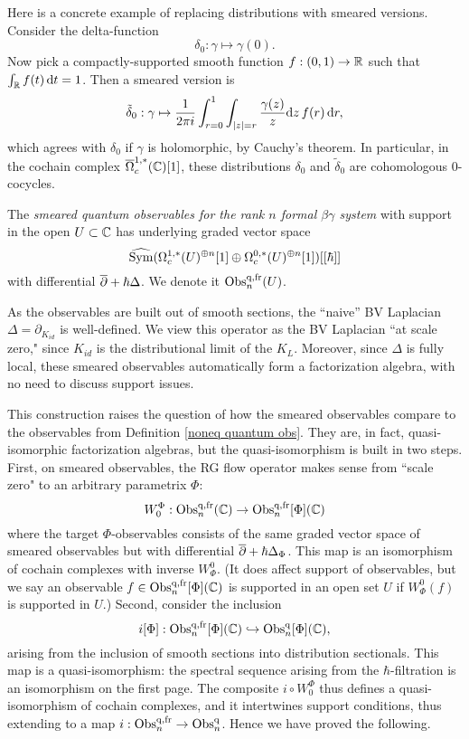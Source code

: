 Here is a concrete example of replacing distributions with smeared versions.
Consider the delta-function 
\[
\delta_0: \gamma \mapsto \gamma(0).
\]
Now pick a compactly-supported smooth function $f: (0,1) \to \mathbb R$ such that $\int_\mathbb R f(t) \, {\rm d} t = 1$.
Then a smeared version is
\[
\tilde{\delta}_0: \gamma \mapsto \frac{1}{2\pi i}\int_{r = 0}^1 \int_{|z|=r} \frac{\gamma(z)}{z} {\rm d} z\, f(r) \,{\rm d} r,
\]
which agrees with $\delta_0$ if $\gamma$ is holomorphic, by Cauchy's theorem.
In particular, in the cochain complex $\overline{\Omega}^{1,*}_c(\mathbb C)[1]$, 
these distributions $\delta_0$ and $\tilde{\delta}_0$ are cohomologous $0$-cocycles.

\def\fr{{\rm fr}}

\begin{dfn}
The \emph{smeared quantum observables for the rank $n$ formal $\beta\gamma$ system} 
with support in the open $U \subset \mathbb C$ has underlying graded vector space
\[
\widehat{{\rm Sym}}({\Omega}^{1,*}_c(U)^{\oplus n}[1] \oplus {\Omega}^{0,*}_c(U)^{\oplus n}[1])[[\hbar]]
\]
with differential $\overline{\partial} + \hbar \Delta$. 
We denote it $\Obs^{\q,\fr}_n(U)$.
\end{dfn}

As the observables are built out of smooth sections, the ``naive'' BV Laplacian $\Delta = \partial_{K_{id}}$ is well-defined.
We view this operator as the BV Laplacian ``at scale zero," since $K_{id}$ is the distributional limit of the $K_L$.
Moreover, since $\Delta$ is fully local, these smeared observables automatically form a factorization algebra,
with no need to discuss support issues.

This construction raises the question of how the smeared observables compare to the observables from Definition \ref{noneq quantum obs}.
They are, in fact, quasi-isomorphic factorization algebras, but the quasi-isomorphism is built in two steps.
First, on smeared observables, the RG flow operator makes sense from ``scale zero" to an arbitrary parametrix $\Phi$:
\[
W_0^\Phi: \Obs^{\q,\fr}_n(\CC) \to \Obs^{\q,\fr}_n[\Phi](\CC)
\]
where the target $\Phi$-observables consists of the same graded vector space of smeared observables 
but with differential $\overline{\partial} +\hbar \Delta_\Phi$.
This map is an isomorphism of cochain complexes with inverse $W_\Phi^0$.
(It does affect support of observables, but we say an observable $f \in \Obs^{\q,\fr}_n[\Phi](\CC)$ is supported in an open set $U$
if $W_\Phi^0(f)$ is supported in $U$.)
Second, consider the inclusion
\[
i[\Phi]: \Obs^{\q,\fr}_n[\Phi](\CC) \hookrightarrow \Obs^{\q}_n[\Phi](\CC),
\]
arising from the inclusion of smooth sections into distribution sectionals. 
This map is a quasi-isomorphism: the spectral sequence arising from the $\hbar$-filtration is an isomorphism on the first page.
The composite $i \circ W_0^\Phi$ thus defines a quasi-isomorphism of cochain complexes,
and it intertwines support conditions, thus extending to a map $i: \Obs^{\q,\fr}_n \to \Obs^{\q}_n$.
Hence we have proved the following.

